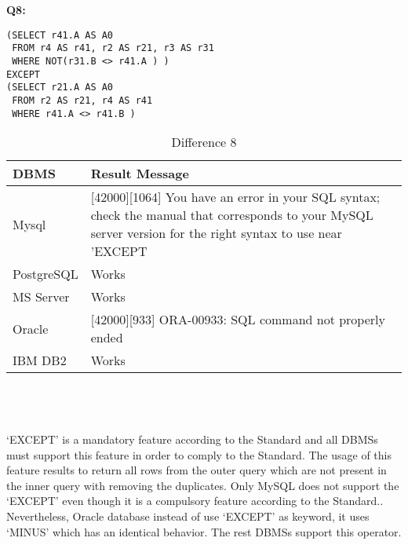 \textbf{Q8:}
\begin{mdframed}[backgroundcolor=lightgray!20]
\begin{lstlisting}[style=SQL]
(SELECT r41.A AS A0
 FROM r4 AS r41, r2 AS r21, r3 AS r31
 WHERE NOT(r31.B <> r41.A ) )
EXCEPT
(SELECT r21.A AS A0
 FROM r2 AS r21, r4 AS r41
 WHERE r41.A <> r41.B )
\end{lstlisting}
\end{mdframed}

\begin{table}[h]
\centering
\caption{Difference 8}
\label{my-label}
\begin{tabular}{|p{2cm}|p{11.5cm}|}
\hline
\textbf{DBMS} & \textbf{Result Message}                                                                                                                                             \\ \hline
Mysql         & {[}42000{]}{[}1064{]} You have an error in your SQL syntax; check the manual that corresponds to your MySQL server version for the right syntax to use near 'EXCEPT \\ \hline
PostgreSQL    & Works                                                                                                                                                               \\ \hline
MS Server     & Works                                                                                                                                                               \\ \hline
Oracle        & {[}42000{]}{[}933{]} ORA-00933: SQL command not properly ended                                                                                                      \\ \hline
IBM DB2       & Works                                                                                                                                                               \\ \hline
\end{tabular}
\end{table}

\hfill\\\\\\
‘EXCEPT’ is a mandatory feature according to the Standard and all DBMSs must support this feature in order to comply to the Standard. The usage of this feature results to return all rows from the outer query which are not present in the inner query with removing the duplicates. Only MySQL does not support the ‘EXCEPT’ even though it is a compulsory feature according to the Standard.. Nevertheless, Oracle database instead of use  ‘EXCEPT’ as keyword, it uses ‘MINUS’ which has an identical behavior. The rest DBMSs support this operator. 


